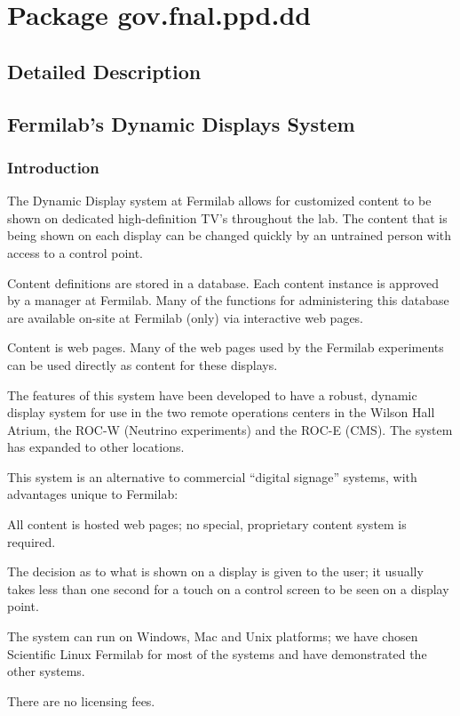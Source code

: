 \hypertarget{namespacegov_1_1fnal_1_1ppd_1_1dd}{\section{Package gov.\-fnal.\-ppd.\-dd}
\label{namespacegov_1_1fnal_1_1ppd_1_1dd}
}


\subsection{Detailed Description}
\subsection*{Fermilab's Dynamic Displays System}

\subsubsection*{Introduction}

The Dynamic Display system at Fermilab allows for customized content to be shown on dedicated high-\/definition T\-V’s throughout the lab. The content that is being shown on each display can be changed quickly by an untrained person with access to a control point. 

Content definitions are stored in a database. Each content instance is approved by a manager at Fermilab. Many of the functions for administering this database are available on-\/site at Fermilab (only) via interactive web pages. 

Content is web pages. Many of the web pages used by the Fermilab experiments can be used directly as content for these displays. 

The features of this system have been developed to have a robust, dynamic display system for use in the two remote operations centers in the Wilson Hall Atrium, the R\-O\-C-\/\-W (Neutrino experiments) and the R\-O\-C-\/\-E (C\-M\-S). The system has expanded to other locations. 

This system is an alternative to commercial “digital signage” systems, with advantages unique to Fermilab\-: 
\begin{DoxyEnumerate}
\item All content is hosted web pages; no special, proprietary content system is required. 
\item The decision as to what is shown on a display is given to the user; it usually takes less than one second for a touch on a control screen to be seen on a display point. 
\item The system can run on Windows, Mac and Unix platforms; we have chosen Scientific Linux Fermilab for most of the systems and have demonstrated the other systems. 
\item There are no licensing fees. 
\end{DoxyEnumerate}

